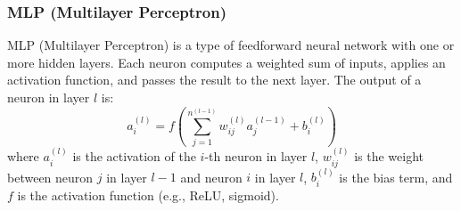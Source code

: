 \subsubsection{MLP (Multilayer Perceptron)}
MLP (Multilayer Perceptron) is a type of feedforward neural network with one or more hidden layers. Each neuron computes a weighted sum of inputs, applies an activation function, and passes the result to the next layer. The output of a neuron in layer $l$ is:
\begin{equation*}
a_i^{(l)} = f \left( \sum_{j=1}^{n^{(l-1)}} w_{ij}^{(l)} a_j^{(l-1)} + b_i^{(l)} \right)
\end{equation*}
where $a_i^{(l)}$ is the activation of the $i$-th neuron in layer $l$, $w_{ij}^{(l)}$ is the weight between neuron $j$ in layer $l-1$ and neuron $i$ in layer $l$, $b_i^{(l)}$ is the bias term, and $f$ is the activation function (e.g., ReLU, sigmoid).









